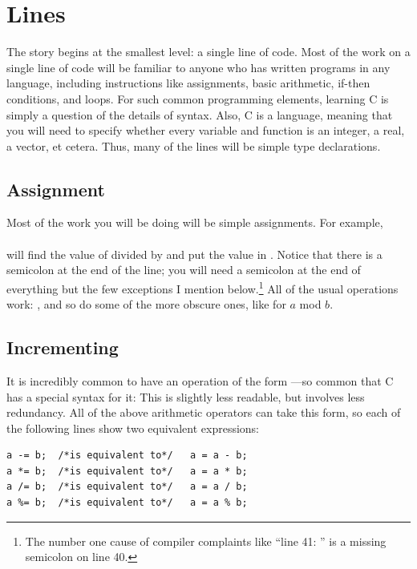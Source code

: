 \section{Lines} \label{fncontents}

The story begins at the smallest level: a single line of code. Most of
the work on a single line of code will be familiar to anyone who has
written programs in any language, including instructions like assignments,
basic arithmetic, if-then conditions, and loops. For such common
programming elements, learning C is simply a question of the details
of syntax. Also, C is a  language, meaning that you will
need to specify whether every variable and function is an integer,
a real, a vector, et cetera. Thus, many of the lines will be simple
type declarations.

\subsection{Assignment}   \index{=}
Most of the work you will be doing will be simple assignments. For example,\\
\\
will find the value of  divided by  and put the
value in . Notice that there is a semicolon at the end of
the line; you will need a semicolon at the end of everything but the few
exceptions I mention below.\footnote{The number one cause of compiler
complaints like ``line 41: '' is a missing semicolon on line 40.} All of the usual operations work: \ci{+
- / *}, and so do some of the more obscure ones, like 
for $a$ mod $b$.  \index{\%}

\subsection{Incrementing} It is incredibly common to have an operation of the form ---so
common that C has a special syntax for it:  This is slightly less readable, but involves less
redundancy. All of the above arithmetic operators can take this form, so each of the following lines show two
equivalent expressions: \\


\begin{lstlisting}
a -= b;  /*is equivalent to*/   a = a - b;
a *= b;  /*is equivalent to*/   a = a * b;
a /= b;  /*is equivalent to*/   a = a / b;
a %= b;  /*is equivalent to*/   a = a % b;
\end{lstlisting}

